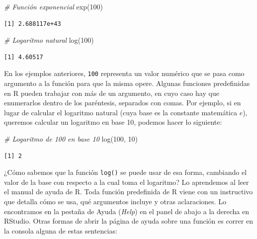 \documentclass[
]{book}
\newenvironment{Shaded}{\begin{snugshade}}{\end{snugshade}}
\newcommand{\CommentTok}[1]{\textcolor[rgb]{0.56,0.35,0.01}{\textit{#1}}}
\newcommand{\DecValTok}[1]{\textcolor[rgb]{0.00,0.00,0.81}{#1}}
\newcommand{\FunctionTok}[1]{\textcolor[rgb]{0.00,0.00,0.00}{#1}}
\newcommand{\NormalTok}[1]{#1}
\begin{document}
\begin{Shaded}
\begin{Highlighting}[]
\CommentTok{\# Función exponencial}
\FunctionTok{exp}\NormalTok{(}\DecValTok{100}\NormalTok{)}
\end{Highlighting}
\end{Shaded}

\begin{verbatim}
[1] 2.688117e+43
\end{verbatim}

\begin{Shaded}
\begin{Highlighting}[]
\CommentTok{\# Logaritmo natural}
\FunctionTok{log}\NormalTok{(}\DecValTok{100}\NormalTok{)}
\end{Highlighting}
\end{Shaded}

\begin{verbatim}
[1] 4.60517
\end{verbatim}

En los ejemplos anteriores, \texttt{100} representa un valor numérico que se pasa como argumento a la función para que la misma opere. Algunas funciones predefinidas en R pueden trabajar con más de un argumento, en cuyo caso hay que enumerarlos dentro de los paréntesis, separados con comas. Por ejemplo, si en lugar de calcular el logaritmo natural (cuya base es la constante matemática \(e\)), queremos calcular un logaritmo en base 10, podemos hacer lo siguiente:

\begin{Shaded}
\begin{Highlighting}[]
\CommentTok{\# Logaritmo de 100 en base 10}
\FunctionTok{log}\NormalTok{(}\DecValTok{100}\NormalTok{, }\DecValTok{10}\NormalTok{)}
\end{Highlighting}
\end{Shaded}

\begin{verbatim}
[1] 2
\end{verbatim}

¿Cómo sabemos que la función \texttt{log()} se puede usar de esa forma, cambiando el valor de la base con respecto a la cual toma el logaritmo? Lo aprendemos al leer el manual de ayuda de R. Toda función predefinida de R viene con un instructivo que detalla cómo se usa, qué argumentos incluye y otras aclaraciones. Lo encontramos en la pestaña de Ayuda (\emph{Help}) en el panel de abajo a la derecha en RStudio. Otras formas de abrir la página de ayuda sobre una función es correr en la consola alguna de estas sentencias:
\end{document}
